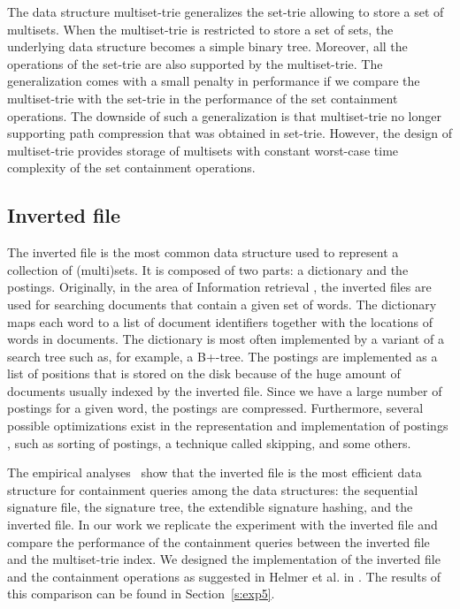 The data structure multiset-trie generalizes the set-trie allowing to store a set of multisets. When the multiset-trie is restricted to store a set of sets, the underlying data structure becomes a simple binary tree. Moreover, all the operations of the set-trie are also supported by the multiset-trie. The generalization comes with a small penalty in performance if we compare the multiset-trie with the set-trie in the performance of the set containment operations. The downside of such a generalization is that multiset-trie no longer supporting path compression that was obtained in set-trie. However, the design of multiset-trie provides storage of multisets with constant worst-case time complexity of the set containment operations.

\subsection{Inverted file\label{rel-invfile}}

The inverted file \cite{zobel1992efficient,zobel1998inverted,zobel2006inverted} is the most common data structure used to represent a collection of (multi)sets. It is composed of two parts: a dictionary and the postings. Originally, in the area of Information retrieval \cite{manning2008introduction}, the inverted files are used for searching documents that contain a given set of words. The dictionary maps each word to a list of document identifiers together with the locations of words in documents. The dictionary is most often implemented by a variant of a search tree such as, for example, a B+-tree. The postings are implemented as a list of positions that is stored on the disk because of the huge amount of documents usually indexed by the inverted file. Since we have a large number of postings for a given word, the postings are compressed. Furthermore, several possible optimizations exist in the representation and implementation of postings \cite{zobel2006inverted}, such as sorting of postings, a technique called skipping, and some others.

The empirical analyses~\cite{Helmer2003,zobel1998inverted} show that the inverted file is the most efficient data structure for containment queries among the data structures: the sequential signature file, the signature tree, the extendible signature hashing, and the inverted file. 
In our work we replicate the experiment with the inverted file and compare the performance of the containment queries between the inverted file and the multiset-trie index. We designed the implementation of the inverted file and the containment operations as suggested in Helmer et al. in \cite{Helmer2003}. The results of this comparison can be found in Section~\ref{s:exp5}.


